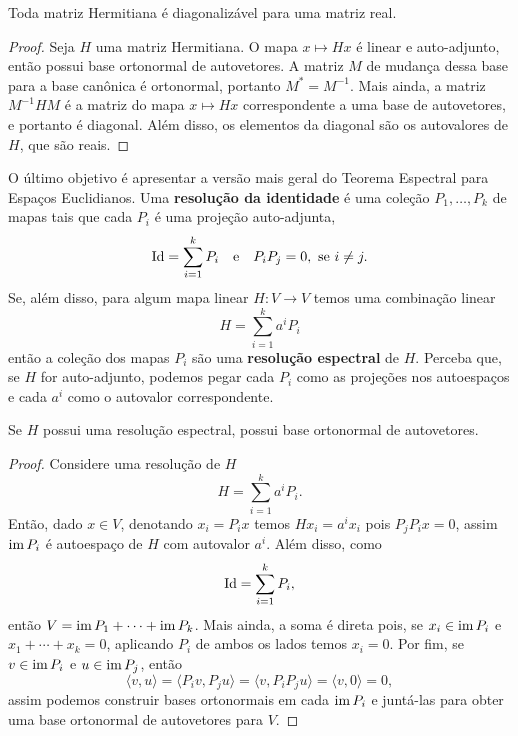 \begin{corollary}
    Toda matriz Hermitiana é diagonalizável para uma matriz real.
\end{corollary}
\begin{proof}
    Seja $H$ uma matriz Hermitiana. O mapa $x \mapsto Hx$ é linear e auto-adjunto, então possui base ortonormal de autovetores. A matriz $M$ de mudança dessa base para a base canônica é ortonormal, portanto $M^* = M^{-1}$. Mais ainda, a matriz $M^{-1}HM$ é a matriz do mapa $x \mapsto Hx$ correspondente a uma base de autovetores, e portanto é diagonal. Além disso, os elementos da diagonal são os autovalores de $H$, que são reais.
\end{proof}

O último objetivo é apresentar a versão mais geral do Teorema Espectral para Espaços Euclidianos. Uma \textbf{resolução da identidade} é uma coleção $P_1, \dots, P_k$ de mapas tais que cada $P_i$ é uma projeção auto-adjunta, \begin{equation}
    \operatorname{Id} = \sum_{i = 1}^k P_i \quad \text{e} \quad  P_iP_j = 0, \text{ se } i \neq j.
\end{equation} Se, além disso, para algum mapa linear $H \colon V \to V$ temos uma combinação linear \begin{equation}
    H = \sum_{i = 1}^k a^i P_i
\end{equation} então a coleção dos mapas $P_i$ são uma \textbf{resolução espectral} de $H$. Perceba que, se $H$ for auto-adjunto, podemos pegar cada $P_i$ como as projeções nos autoespaços e cada $a^i$ como o autovalor correspondente.

\begin{lemma}
    Se $H$ possui uma resolução espectral, possui base ortonormal de autovetores.
\end{lemma}
\begin{proof}
    Considere uma resolução de $H$ \begin{equation}
        H = \sum_{i = 1}^k a^i P_i.
    \end{equation} Então, dado $x \in V$, denotando $x_i = P_ix$ temos $Hx_i = a^ix_i$ pois $P_jP_ix = 0$, assim $\operatorname{im} P_i$ é autoespaço de $H$ com autovalor $a^i$. Além disso, como \begin{equation}
        \operatorname{Id} = \sum_{i = 1}^k P_i,
    \end{equation} então $V = \operatorname{im} P_1 + \cdots + \operatorname{im} P_k$. Mais ainda, a soma é direta pois, se $x_i \in \operatorname{im} P_i$ e $x_1 + \cdots + x_k = 0$, aplicando $P_i$ de ambos os lados temos $x_i = 0$. Por fim, se $v \in \operatorname{im} P_i$ e $u \in \operatorname{im} P_j$, então \begin{equation}
        \langle v, u \rangle = \langle P_i v, P_j u \rangle = \langle v, P_iP_j u \rangle = \langle v, 0 \rangle = 0,
    \end{equation} assim podemos construir bases ortonormais em cada $\operatorname{im} P_i$ e juntá-las para obter uma base ortonormal de autovetores para $V$.
\end{proof}


